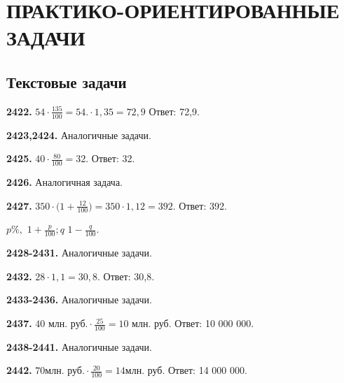 \chapter{ПРАКТИКО-ОРИЕНТИРОВАННЫЕ ЗАДАЧИ}
\section{Текстовые задачи}


\textbf{2422.} $54 \cdot \frac{135}{100} = 54. \cdot 1,35 = 72,9$ \newline \null \hspace*{\fill} Ответ: 72,9.

\textbf{2423,2424.} Аналогичные задачи.

\textbf{2425.} $40 \cdot \frac{80}{100} = 32.$ \newline \null \hspace*{\fill} Ответ: 32.

\textbf{2426.} Аналогичная задача.

\textbf{2427.} $350 \cdot \big( 1+\frac{12}{100}\big) = 350 \cdot 1,12 = 392$. \newline \null \hspace*{\fill} Ответ: 392. 

 $p\%,$\newline{} $1 + \frac{p}{100};$$q$  $1 - \frac{q}{100}.$

\textbf{2428-2431.} Аналогичные задачи.

\textbf{2432.} $28 \cdot 1,1 = 30,8.$ \newline \null \hspace*{\fill} Ответ: 30,8. 

\textbf{2433-2436.} Аналогичные задачи.

\textbf{2437.} $\text{40 млн. руб.} \cdot \frac{25}{100} = \text{10 млн. руб.}$ \newline \null \hspace*{\fill} Ответ: 10 000 000. 

\textbf{2438-2441.} Аналогичные задачи.

\textbf{2442.}  \newline $70 \text{млн. руб.}\cdot \frac{20}{100} = 14 \text{млн. руб.} $ \newline \null \hspace*{\fill} Ответ: 14 000 000. 

